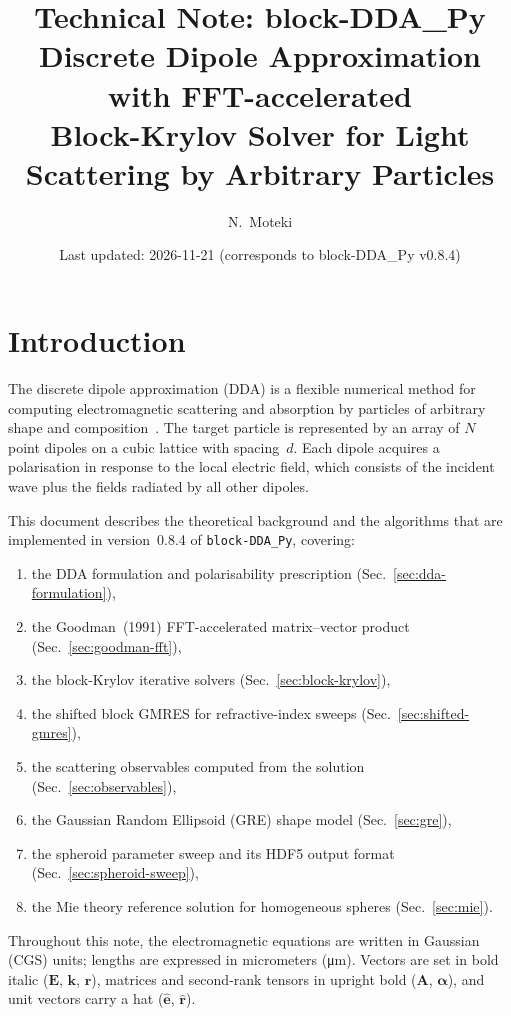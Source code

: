 \documentclass[11pt,a4paper]{article}
\title{Technical Note: block-DDA\_Py\\[4pt]
\large Discrete Dipole Approximation with FFT-accelerated\\
Block-Krylov Solver for Light Scattering by Arbitrary Particles}
\author{N.\ Moteki}
\date{Last updated: 2026-11-21 (corresponds to block-DDA\_Py v0.8.4)}
\begin{document}
\maketitle
\tableofcontents
\newpage

\section{Introduction}
\label{sec:introduction}

The discrete dipole approximation (DDA) is a flexible numerical method for
computing electromagnetic scattering and absorption by particles of arbitrary
shape and composition~\cite{Purcell1973,Draine1988}.
The target particle is represented by an array of $N$ point dipoles on a cubic
lattice with spacing~$d$.  Each dipole acquires a polarisation in response to
the local electric field, which consists of the incident wave plus the fields
radiated by all other dipoles.

This document describes the theoretical background and the algorithms
that are implemented in version~0.8.4 of
\texttt{block-DDA\_Py}, covering:
\begin{enumerate}
  \item the DDA formulation and polarisability prescription
        (Sec.~\ref{sec:dda-formulation}),
  \item the Goodman~(1991) FFT-accelerated matrix--vector product
        (Sec.~\ref{sec:goodman-fft}),
  \item the block-Krylov iterative solvers
        (Sec.~\ref{sec:block-krylov}),
  \item the shifted block GMRES for refractive-index sweeps
        (Sec.~\ref{sec:shifted-gmres}),
  \item the scattering observables computed from the solution
        (Sec.~\ref{sec:observables}),
  \item the Gaussian Random Ellipsoid (GRE) shape model
        (Sec.~\ref{sec:gre}),
  \item the spheroid parameter sweep and its HDF5 output format
        (Sec.~\ref{sec:spheroid-sweep}),
  \item the Mie theory reference solution for homogeneous spheres
        (Sec.~\ref{sec:mie}).
\end{enumerate}

Throughout this note, the electromagnetic equations are written in
Gaussian (CGS) units; lengths are expressed in micrometers (\si{\micro\metre}).
Vectors are set in bold italic ($\bm{E}$, $\bm{k}$, $\bm{r}$),
matrices and second-rank tensors in upright bold ($\mathbf{A}$,
$\boldsymbol{\alpha}$), and unit vectors carry a hat
($\hat{\bm{e}}$, $\hat{\bm{r}}$).
\end{document}

